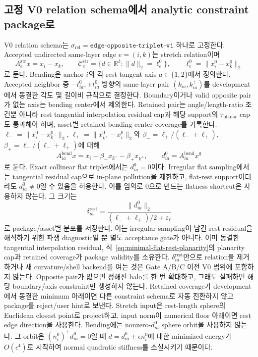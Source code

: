 \documentclass[11pt]{article}
\begin{document}
\subsection{고정 V0 relation schema에서 analytic constraint package로}

V0 relation schema는
\(\sigma_{\mathrm{rel}}=\texttt{edge-opposite-triplet-v1}\) 하나로 고정한다.
Accepted undirected same-layer edge \(e=(i,k)\)는 stretch relation이며
\[
  A_e^{\mathrm{str}}x=x_i-x_k,
  \qquad
  \mathcal C_e^{\mathrm{str}}
  =\{d\in\mathbb R^3:\|d\|_2=\ell_e^0\},
  \qquad
  \ell_e^0=\|x_i^0-x_k^0\|_2
\]
로 둔다. Bending은 anchor \(i\)의 각 rest tangent axis \(a\in\{1,2\}\)에서 정의한다.
Accepted neighbor 중 \(-t_{ia}^0,+t_{ia}^0\) 방향의 same-layer pair
\((k_{ia}^-,k_{ia}^+)\)를 development에서 동결한 각도 및 길이비 규칙으로 결정한다.
Boundary이거나 valid opposite pair가 없는 axis는 bending center에서 제외한다.
Retained pair는 angle/length-ratio 조건뿐 아니라 rest tangential interpolation residual cap과
해당 support의 \(\tau_{\mathrm{planar}}\) cap도 통과해야 하며,
asset별 retained bending-center coverage를 기록한다.
\(\ell_-=\|x_i^0-x_{k^-}^0\|_2\),
\(\ell_+=\|x_{k^+}^0-x_i^0\|_2\)와
\(\beta_-={\ell_+}/{(\ell_-+\ell_+)}\),
\(\beta_+={\ell_-}/{(\ell_-+\ell_+)}\)에 대해
\[
  A_{ia}^{\mathrm{bend}}x
  =x_i-\beta_-x_{k^-}-\beta_+x_{k^+},
  \qquad
  d_{ia}^0=A_{ia}^{\mathrm{bend}}x^0
\]
로 둔다. Exact collinear flat triplet에서는 \(d_{ia}^0=0\)이다.
Irregular flat sampling에서는 tangential residual cap으로 in-plane pollution을 제한하고,
flat-rest support이더라도 \(d_{ia}^0\neq0\)일 수 있음을 허용한다.
이를 임의로 0으로 만드는 flatness shortcut은 사용하지 않는다.
그 크기는
\begin{equation}
  \delta_{ia}^{\mathrm{rest}}
  =\frac{\|d_{ia}^0\|_2}
  {(\ell_-+\ell_+)/2+\varepsilon_\ell}
  \label{eq:minimal-irregular-rest-diagnostic}
\end{equation}
로 package/asset별 분포를 저장한다. 이는 irregular sampling이 남긴 rest residual을 해석하기 위한
파생 diagnostic일 뿐 별도 acceptance gate가 아니다. 이미 동결한 tangential interpolation residual,
식~\eqref{eq:minimal-flat-rest-planarity}의 planarity cap과 retained coverage가 package validity를 소유한다.
\(\delta_{ia}^{\mathrm{rest}}\)만으로 relation을 제거하거나 새 curvature/shell backend를 여는 것은
Gate A/B/C 이전 V0 범위에 포함하지 않는다.
Opposite pair가 없으면 정해진 halo를 한 번 확대하고, 그래도 실패하면 해당 boundary/axis constraint만
생성하지 않는다. Retained coverage가 development에서 동결한 minimum 아래이면
다른 constraint schema로 자동 전환하지 않고 package를 reject/user hint로 보낸다.
Stretch input은 rest-length sphere의 Euclidean closest point로 project하고, input norm이 numerical
floor 아래이면 rest edge direction을 사용한다. Bending에는 nonzero-\(d_{ia}^0\) sphere orbit을 사용하지
않는다. 그 orbit은 \((n_i^0)^\top d_{ia}^0=0\)일 때
\(d=d_{ia}^0+\epsilon n_i^0\)에 대한 minimized energy가 \(O(\epsilon^4)\)로 시작하여
normal quadratic stiffness를 소실시키기 때문이다.
\end{document}
